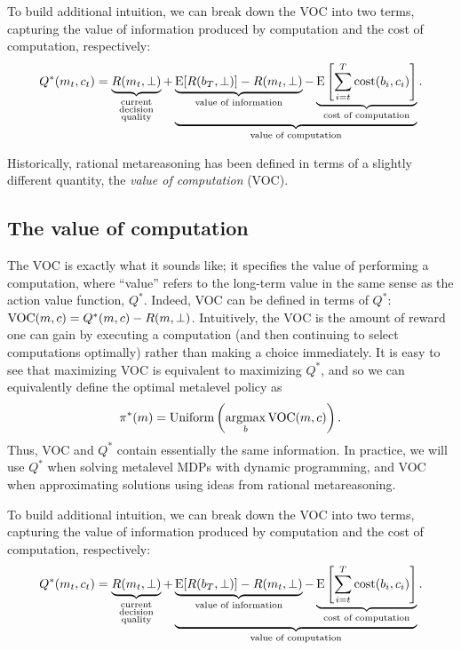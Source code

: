 To build additional intuition, we can break down the VOC into two terms, capturing the value of information produced by computation and the cost of computation, respectively:
%
\begin{equation}
  Q^*(m_t, c_t) = 
    \underbrace{R(m_t, \bot)
    }_{
      \substack{\text{current}\\ \text{decision}\\ \text{quality}}
    } +
    \underbrace{
      \underbrace{
        \operatorname*{E}[R(b_T, \bot)] - R(m_t, \bot)
      }_{
        \text{value of information}
      } - 
      \underbrace{
        \operatorname*{E}\left[\sum_{i=t}^T \text{cost}(b_i, c_i) \right]
      }_{
        \text{cost of computation}
      }
    }_{
      \text{value of computation}
    }.
\end{equation}
%



Historically, rational metareasoning \citep{russell1991principles} has been defined in terms of a slightly different quantity, the \emph{value of computation} (VOC). 

\subsection{The value of computation}
The VOC is exactly what it sounds like; it specifies the value of performing a computation, where ``value'' refers to the long-term value in the same sense as the action value function, $Q^*$. Indeed, VOC can be defined in terms of $Q^*$: $\text{VOC}(m, c) = Q^*(m, c) - R(m, \bot)$. Intuitively, the VOC is the amount of reward one can gain by executing a computation (and then continuing to select computations optimally) rather than making a choice immediately. It is easy to see that maximizing VOC is equivalent to maximizing $Q^*$, and so we can equivalently define the optimal metalevel policy as
%
\begin{equation}
  \pi^*(m) = \text{Uniform}\left(\operatorname*{argmax}_b \text{VOC}(m, c)\right).
\end{equation}
%
Thus, VOC and $Q^*$ contain essentially the same information. In practice, we will use $Q^*$ when solving metalevel MDPs with dynamic programming, and VOC when approximating solutions using ideas from rational metareasoning.

To build additional intuition, we can break down the VOC into two terms, capturing the value of information produced by computation and the cost of computation, respectively:
%
\begin{equation}
  Q^*(m_t, c_t) = 
    \underbrace{R(m_t, \bot)
    }_{
      \substack{\text{current}\\ \text{decision}\\ \text{quality}}
    } +
    \underbrace{
      \underbrace{
        \operatorname*{E}[R(b_T, \bot)] - R(m_t, \bot)
      }_{
        \text{value of information}
      } - 
      \underbrace{
        \operatorname*{E}\left[\sum_{i=t}^T \text{cost}(b_i, c_i) \right]
      }_{
        \text{cost of computation}
      }
    }_{
      \text{value of computation}
    }.
\end{equation}
%




